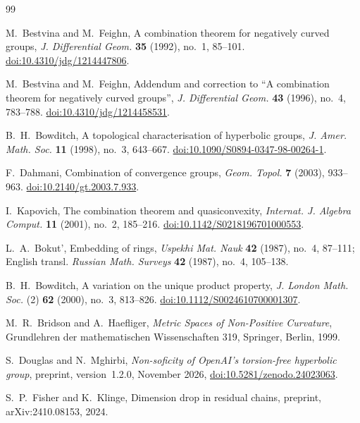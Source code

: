 \begin{thebibliography}{99}
\raggedright


M.~Bestvina and M.~Feighn,
A combination theorem for negatively curved groups,
\emph{J. Differential Geom.} \textbf{35} (1992), no.~1, 85--101.
\href{https://doi.org/10.4310/jdg/1214447806}{doi:10.4310/jdg/1214447806}.

M.~Bestvina and M.~Feighn,
Addendum and correction to ``A combination theorem for negatively curved groups'',
\emph{J. Differential Geom.} \textbf{43} (1996), no.~4, 783--788.
\href{https://doi.org/10.4310/jdg/1214458531}{doi:10.4310/jdg/1214458531}.

B.~H.~Bowditch,
A topological characterisation of hyperbolic groups,
\emph{J. Amer. Math. Soc.} \textbf{11} (1998), no.~3, 643--667.
\href{https://doi.org/10.1090/S0894-0347-98-00264-1}{doi:10.1090/S0894-0347-98-00264-1}.

F.~Dahmani,
Combination of convergence groups,
\emph{Geom. Topol.} \textbf{7} (2003), 933--963.
\href{https://doi.org/10.2140/gt.2003.7.933}{doi:10.2140/gt.2003.7.933}.

I.~Kapovich,
The combination theorem and quasiconvexity,
\emph{Internat. J. Algebra Comput.} \textbf{11} (2001), no.~2, 185--216.
\href{https://doi.org/10.1142/S0218196701000553}{doi:10.1142/S0218196701000553}.

L.~A.~Bokut',
Embedding of rings,
\emph{Uspekhi Mat. Nauk} \textbf{42} (1987), no.~4, 87--111;
English transl. \emph{Russian Math. Surveys} \textbf{42} (1987), no.~4,
105--138.

B.~H.~Bowditch,
A variation on the unique product property,
\emph{J. London Math. Soc.} (2) \textbf{62} (2000), no.~3, 813--826.
\href{https://doi.org/10.1112/S0024610700001307}{doi:10.1112/S0024610700001307}.

M.~R.~Bridson and A.~Haefliger,
\emph{Metric Spaces of Non-Positive Curvature},
Grundlehren der mathematischen Wissenschaften 319,
Springer, Berlin, 1999.

S.~Douglas and N.~Mghirbi,
\emph{Non-soficity of OpenAI's torsion-free hyperbolic group},
preprint, version~1.2.0, November 2026,
\href{https://doi.org/10.5281/zenodo.24023063}{doi:10.5281/zenodo.24023063}.

S.~P.~Fisher and K.~Klinge,
Dimension drop in residual chains,
preprint, arXiv:2410.08153, 2024.


\end{thebibliography}
